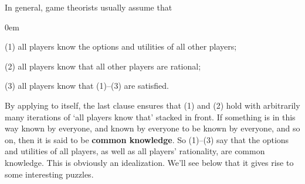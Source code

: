 In general, game theorists usually assume that
\begin{enumerate*}
\itemsep0em
\item[(1)] all players know the options and utilities of all other players;
\item[(2)] all players know that all other players are rational;
\item[(3)] all players know that (1)--(3) are satisfied.
\end{enumerate*}
By applying to itself, the last clause ensures that (1) and (2) hold
with arbitrarily many iterations of `all players know that' stacked in
front. If something is in this way known by everyone, and known by
everyone to be known by everyone, and so on, then it is said to be
\textbf{common knowledge}. So (1)--(3) say that the options and
utilities of all players, as well as all players' rationality, are
common knowledge. This is obviously an idealization. We'll see below
that it gives rise to some interesting puzzles.


